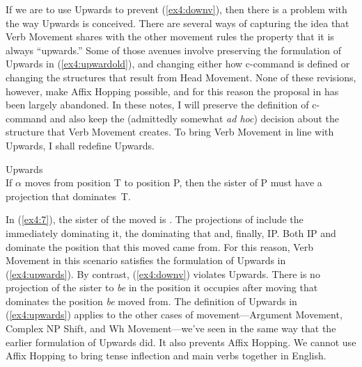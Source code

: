 If we are to use Upwards to prevent (\ref{ex4:downv}), then there is a problem with the way Upwards is conceived. There are several ways of capturing the idea that Verb Movement shares with the other movement rules the property that it is always ``upwards.'' Some of those avenues involve preserving the formulation of Upwards in (\ref{ex4:upwardold}), and changing either how c-command is defined or changing the structures that result from Head Movement. None of these revisions, however, make Affix Hopping possible, and for this reason the proposal in \citet{Chomsky:1957} has been largely abandoned. In these notes, I will preserve the definition of c-command and also keep the (admittedly somewhat \emph{ad hoc}) decision about the structure that Verb Movement creates. To bring Verb Movement in line with Upwards, I shall redefine Upwards. 
\begin{exe}
	\raggedright
	\ex \label{ex4:upwards} Upwards\\
	If $\alpha$ moves from position T to position P, then the sister of P must have a projection that dominates~T.
\end{exe}
In (\ref{ex4:7}), the sister of the moved  is . The projections of  include the  immediately dominating it, the  dominating that  and, finally, IP. Both IP and  dominate the position that this moved  came from. For this reason, Verb Movement in this scenario satisfies the formulation of Upwards in (\ref{ex4:upwards}). By contrast, (\ref{ex4:downv}) violates Upwards. There is no projection of the sister to \emph{be} in the position it occupies after moving that dominates the position \emph{be} moved from. The definition of Upwards in (\ref{ex4:upwards}) applies to the other cases of movement---Argument Movement, Complex NP Shift, and Wh Movement---we've seen in the same way that the earlier formulation of Upwards did. It also prevents Affix Hopping. We cannot use Affix Hopping to bring tense inflection and main verbs together in English.

